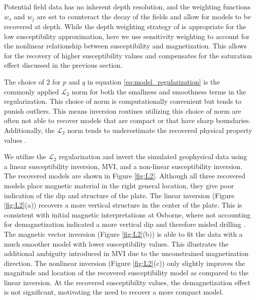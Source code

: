 \documentclass{segabs}
\begin{document}
Potential field data has no inherent depth resolution, and the weighting functions $w_s$ and $w_j$  are set to counteract the decay of the fields and allow for models to be recovered at depth. While the depth weighting strategy of \cite{Li1996} is appropriate for the low susceptibility approximation, here we use sensitivity weighting to account for the nonlinear relationship between susceptibility and magnetization. This allows for the recovery of higher susceptibility values and compensates for the saturation effect discussed in the previous section.

The choice of $2$ for $p$ and $q$ in equation \ref{eq:model_regularization} is the commonly applied $\mathcal{L}_2$ norm for both the smallness and smoothness terms in the regularization. This choice of norm is computationally convenient but tends to punish outliers. This means inversion routines utilizing this choice of norm are often not able to recover models that are compact or that have sharp boundaries. Additionally, the $\mathcal{L}_2$ norm tends to underestimate the recovered physical property values \citep{Oldenburg2005,Sun2020}.



We utilize the $\mathcal{L}_2$ regularization and invert the simulated geophysical data using a linear susceptibility inversion, MVI, and a non-linear susceptibility inversion. The recovered models are shown in Figure \ref{fig:L2}. Although all three recovered models place magnetic material in the right general location, they give poor indication of the dip and structure of the plate.  The linear inversion (Figure \ref{fig:L2}(a))  recovers a more vertical structure in the center of the plate. This is consistent with initial magnetic interpretations at Osborne, where not accounting for demagnetization indicated a more vertical dip and therefore misled drilling \citep{Clark2000}. The magnetic vector inversion (Figure \ref{fig:L2}(b)) is able to fit the data with a much smoother model with lower susceptibility values. This illustrates the additional ambiguity introduced in MVI due to the unconstrained magnetization direction. The nonlinear inversion (Figure \ref{fig:L2}(c)) only slightly improves the magnitude and location of the recovered susceptibility model as compared to the linear inversion.  At the recovered susceptibility values, the demagnetization effect is not significant, motivating the need to recover a more compact model.

\vspace{-0.45cm}
\end{document}
